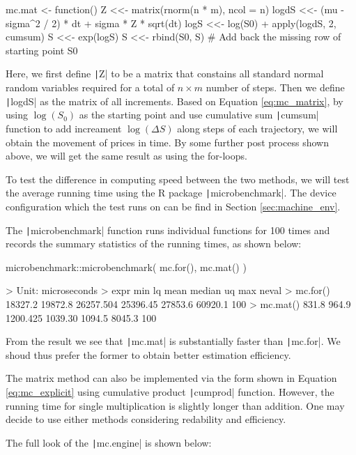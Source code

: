 \begin{Rminted}
mc.mat <- function() {
    Z <<- matrix(rnorm(n * m), ncol = n)
    logdS <<- (mu - sigma^2 / 2) * dt + sigma * Z * sqrt(dt)
    logS <<- log(S0) + apply(logdS, 2, cumsum)
    S <<- exp(logS)
    S <<- rbind(S0, S) # Add back the missing row of starting point S0
}
\end{Rminted}

Here, we first define \texttt|Z| to be a matrix that constains all standard normal random variables required for a total of $n\times m$ number of steps. Then we define \texttt|logdS| as the matrix of all increments. Based on Equation \ref{eq:mc_matrix}, by using $\log(S_0)$ as the starting point and use cumulative sum \texttt|cumsum| function to add increament $\log(\Delta S)$ along steps of each trajectory, we will obtain the movement of prices in time. By some further post process shown above, we will get the same result as using the for-loops.

To test the difference in computing speed between the two methods, we will test the average running time using the R package \texttt|microbenchmark|. The device configuration which the test runs on can be find in Section \ref{sec:machine_env}.

The \texttt|microbenchmark| function runs individual functions for 100 times and records the summary statistics of the running times, as shown below:

\begin{Rminted}
microbenchmark::microbenchmark(
    mc.for(),
    mc.mat()
)

>     Unit: microseconds
>     expr     min      lq      mean   median      uq     max neval
> mc.for() 18327.2 19872.8 26257.504 25396.45 27853.6 60920.1   100
> mc.mat()   831.8   964.9  1200.425  1039.30  1094.5  8045.3   100
\end{Rminted}

From the result we see that \texttt|mc.mat| is substantially faster than \texttt|mc.for|. We shoud thus prefer the former to obtain better estimation efficiency.

The matrix method can also be implemented via the form shown in Equation \ref{eq:mc_explicit} using cumulative product \texttt|cumprod| function. However, the running time for single multiplication is slightly longer than addition. One may decide to use either methods considering redability and efficiency.

The full look of the \texttt|mc.engine| is shown below:

